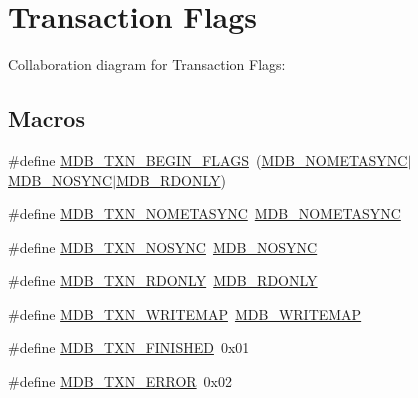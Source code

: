 \hypertarget{group__mdb__txn}{}\section{Transaction Flags}
\label{group__mdb__txn}
Collaboration diagram for Transaction Flags\+:
\subsection*{Macros}
\begin{DoxyCompactItemize}
\item 
\#define \mbox{\hyperlink{group__mdb__txn_gad9afcb51edcbf5ad5d69c2005e944d46}{M\+D\+B\+\_\+\+T\+X\+N\+\_\+\+B\+E\+G\+I\+N\+\_\+\+F\+L\+A\+GS}}~(\mbox{\hyperlink{group__mdb__env_ga5021c4e96ffe9f383f5b8ab2af8e4b16}{M\+D\+B\+\_\+\+N\+O\+M\+E\+T\+A\+S\+Y\+NC}}$\vert$\mbox{\hyperlink{group__mdb__env_ga5791dd1adb09123f82dd1f331209e12e}{M\+D\+B\+\_\+\+N\+O\+S\+Y\+NC}}$\vert$\mbox{\hyperlink{group__mdb__env_gac4c41c0ae044127b2fc80420c323cac6}{M\+D\+B\+\_\+\+R\+D\+O\+N\+LY}})
\item 
\#define \mbox{\hyperlink{group__mdb__txn_gab0c610d1bdce4b05b0e8ce2310589ea3}{M\+D\+B\+\_\+\+T\+X\+N\+\_\+\+N\+O\+M\+E\+T\+A\+S\+Y\+NC}}~\mbox{\hyperlink{group__mdb__env_ga5021c4e96ffe9f383f5b8ab2af8e4b16}{M\+D\+B\+\_\+\+N\+O\+M\+E\+T\+A\+S\+Y\+NC}}
\item 
\#define \mbox{\hyperlink{group__mdb__txn_ga499024e46a7eae7f41b359c9166a8505}{M\+D\+B\+\_\+\+T\+X\+N\+\_\+\+N\+O\+S\+Y\+NC}}~\mbox{\hyperlink{group__mdb__env_ga5791dd1adb09123f82dd1f331209e12e}{M\+D\+B\+\_\+\+N\+O\+S\+Y\+NC}}
\item 
\#define \mbox{\hyperlink{group__mdb__txn_ga8b592ca7b3e70786c23510f9f56a0ae2}{M\+D\+B\+\_\+\+T\+X\+N\+\_\+\+R\+D\+O\+N\+LY}}~\mbox{\hyperlink{group__mdb__env_gac4c41c0ae044127b2fc80420c323cac6}{M\+D\+B\+\_\+\+R\+D\+O\+N\+LY}}
\item 
\#define \mbox{\hyperlink{group__mdb__txn_ga03da701716875fe8b56118a63a4106ab}{M\+D\+B\+\_\+\+T\+X\+N\+\_\+\+W\+R\+I\+T\+E\+M\+AP}}~\mbox{\hyperlink{group__mdb__env_ga7b81e9fd5f8fae38786d67e1a8387fa7}{M\+D\+B\+\_\+\+W\+R\+I\+T\+E\+M\+AP}}
\item 
\#define \mbox{\hyperlink{group__mdb__txn_gabef55eae8d32bc3d6fafff8495bfc4a0}{M\+D\+B\+\_\+\+T\+X\+N\+\_\+\+F\+I\+N\+I\+S\+H\+ED}}~0x01
\item 
\#define \mbox{\hyperlink{group__mdb__txn_gadf70c805448c5b852647f5fdf7233a7d}{M\+D\+B\+\_\+\+T\+X\+N\+\_\+\+E\+R\+R\+OR}}~0x02
\item 

\end{DoxyCompactItemize}
